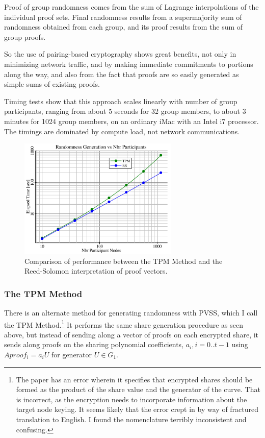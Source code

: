 \documentclass{yellowpaper}
\begin{document}
Proof of group randomness comes from the sum of Lagrange interpolations of the individual proof sets.
Final randomness results from a supermajority sum of randomness obtained from each group, and its proof results from the sum of group proofs. 

So the use of pairing-based cryptography shows great benefits, not only in minimizing network traffic, and by making immediate commitments to portions along the way, and also from the fact that proofs are so easily generated as simple sums of existing proofs.

Timing tests show that this approach scales linearly with number of group participants, ranging from about 5 seconds for 32 group members, to about 3 minutes for 1024 group members, on an ordinary iMac with an Intel i7 processor. The timings are dominated by compute load, not network communications.

\begin{figure}[h!]
  \centering
  \includegraphics[width=3in]{randtimings}
  \caption{ Comparison of performance between the TPM Method and the Reed-Solomon interpretation of proof vectors.}
  \label{fig:randtimings}
\end{figure}


\subsubsection{The TPM Method}
There is an alternate method for generating randomness with PVSS, which I call the TPM Method.\cite{tpm}\footnote{The paper has an error wherein it specifies that encrypted shares should be formed as the product of the share value and the generator of the curve. That is incorrect, as the encryption needs to incorporate information about the target node keying. It seems likely that the error crept in by way of fractured translation to English. I found the nomenclature terribly inconsistent and confusing.} It performs the same share generation procedure as seen above, but instead of sending along a vector of proofs on each encrypted share, it sends along proofs on the sharing polynomial coefficients, $a_i, i = 0..t-1$ using $Aproof_i = a_i U$ for generator $U \in G_1$.
\end{document}
